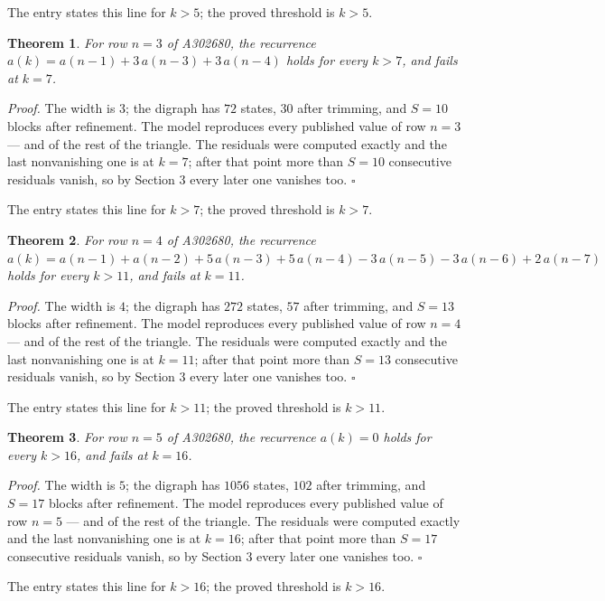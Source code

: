 \documentclass[11pt]{article}
\newtheorem{theorem}{Theorem}
\theoremstyle{definition}
\begin{document}
The entry states this line for $k > 5$; the proved threshold is $k > 5$.

\begin{theorem} For row $n = 3$ of A302680, the recurrence $a(k) = a(n-1) + 3\,a(n-3) + 3\,a(n-4)$ holds for every $k > 7$, and fails at $k = 7$.\end{theorem}

{\itshape Proof.} The width is $3$; the digraph has $72$ states, $30$ after trimming, and $S = 10$ blocks after refinement. The model reproduces every published value of row $n = 3$ --- and of the rest of the triangle. The residuals were computed exactly and the last nonvanishing one is at $k = 7$; after that point more than $S = 10$ consecutive residuals vanish, so by Section 3 every later one vanishes too. $\square$

The entry states this line for $k > 7$; the proved threshold is $k > 7$.

\begin{theorem} For row $n = 4$ of A302680, the recurrence $a(k) = a(n-1) + a(n-2) + 5\,a(n-3) + 5\,a(n-4) - 3\,a(n-5) - 3\,a(n-6) + 2\,a(n-7)$ holds for every $k > 11$, and fails at $k = 11$.\end{theorem}

{\itshape Proof.} The width is $4$; the digraph has $272$ states, $57$ after trimming, and $S = 13$ blocks after refinement. The model reproduces every published value of row $n = 4$ --- and of the rest of the triangle. The residuals were computed exactly and the last nonvanishing one is at $k = 11$; after that point more than $S = 13$ consecutive residuals vanish, so by Section 3 every later one vanishes too. $\square$

The entry states this line for $k > 11$; the proved threshold is $k > 11$.

\begin{theorem} For row $n = 5$ of A302680, the recurrence $a(k) = 0$ holds for every $k > 16$, and fails at $k = 16$.\end{theorem}

{\itshape Proof.} The width is $5$; the digraph has $1056$ states, $102$ after trimming, and $S = 17$ blocks after refinement. The model reproduces every published value of row $n = 5$ --- and of the rest of the triangle. The residuals were computed exactly and the last nonvanishing one is at $k = 16$; after that point more than $S = 17$ consecutive residuals vanish, so by Section 3 every later one vanishes too. $\square$

The entry states this line for $k > 16$; the proved threshold is $k > 16$.
\end{document}
